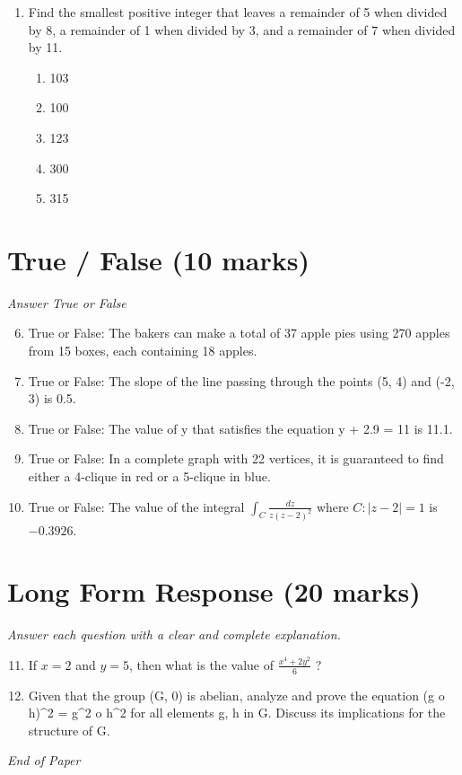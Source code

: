 \documentclass[12pt]{article}
\begin{document}
\begin{enumerate}[label=\arabic*.]
\begin{enumerate}[label=(\alph*)]
    \item 1512
    \item 4096
    \item 3025
\end{enumerate}
\item Find the smallest positive integer that leaves a remainder of 5 when divided by 8, a
remainder of 1 when divided by 3, and a remainder of 7 when divided by 11.
\begin{enumerate}[label=(\alph*)]
    \item 103
    \item 100
    \item 123
    \item 300
    \item 315
\end{enumerate}
\end{enumerate}

\section*{True / False (10 marks)}
\textit{Answer True or False}
\begin{enumerate}[label=\arabic*.]
\setcounter{enumi}{5}
\item True or False: The bakers can make a total of 37 apple pies using 270 apples from 15 boxes, each containing 18 apples.
\item True or False: The slope of the line passing through the points (5, 4) and (-2, 3) is 0.5.
\item True or False: The value of y that satisfies the equation y + 2.9 = 11 is 11.1.
\item True or False: In a complete graph with 22 vertices, it is guaranteed to find either a 4-clique in red or a 5-clique in blue.
\item True or False: The value of the integral \( \int_C \frac{dz}{z (z-2)^2} \) where \( C: |z - 2| = 1 \) is \( -0.3926 \).
\end{enumerate}

\section*{Long Form Response (20 marks)}
\textit{Answer each question with a clear and complete explanation.}
\begin{enumerate}[label=\arabic*.]
\setcounter{enumi}{10}
\item If $x = 2$ and $y = 5$, then what is the value of $\frac{x^4+2y^2}{6}$ ?
\item Given that the group (G, 0) is abelian, analyze and prove the equation (g o h)\^{}2 = g\^{}2 o
h\^{}2 for all elements g, h in G. Discuss its implications for the structure of G.
\end{enumerate}

\vfill
\noindent\textit{End of Paper}
\end{document}
